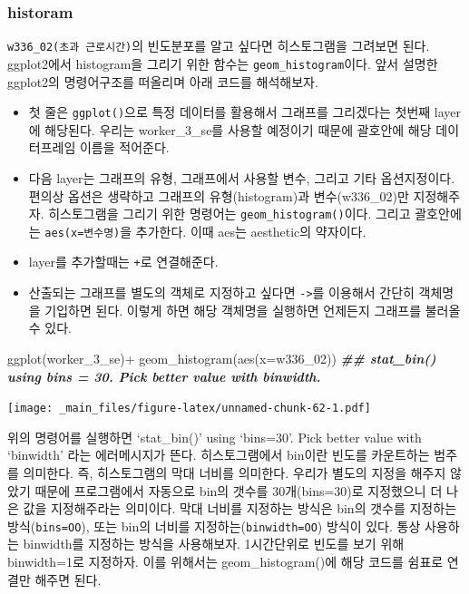 \documentclass[
]{book}
\newenvironment{Shaded}{\begin{snugshade}}{\end{snugshade}}
\newcommand{\AttributeTok}[1]{\textcolor[rgb]{0.77,0.63,0.00}{#1}}
\newcommand{\DocumentationTok}[1]{\textcolor[rgb]{0.56,0.35,0.01}{\textbf{\textit{#1}}}}
\newcommand{\FunctionTok}[1]{\textcolor[rgb]{0.00,0.00,0.00}{#1}}
\newcommand{\NormalTok}[1]{#1}
\newcommand{\SpecialCharTok}[1]{\textcolor[rgb]{0.00,0.00,0.00}{#1}}
\providecommand{\tightlist}{%
  \setlength{\itemsep}{0pt}\setlength{\parskip}{0pt}}
\theoremstyle{definition}
\theoremstyle{definition}
\theoremstyle{definition}
\theoremstyle{definition}
\theoremstyle{remark}
\begin{document}
\hypertarget{historam}{%
\subsubsection{historam}\label{historam}}

\texttt{w336\_02(초과\ 근로시간)}의 빈도분포를 알고 싶다면 히스토그램을 그려보면 된다. ggplot2에서 histogram을 그리기 위한 함수는 \texttt{geom\_histogram}이다. 앞서 설명한 ggplot2의 명령어구조를 떠올리며 아래 코드를 해석해보자.

\begin{itemize}
\tightlist
\item
  첫 줄은 \texttt{ggplot()}으로 특정 데이터를 활용해서 그래프를 그리겠다는 첫번째 layer에 해당된다. 우리는 worker\_3\_se를 사용할 예정이기 때문에 괄호안에 해당 데이터프레임 이름을 적어준다.
\item
  다음 layer는 그래프의 유형, 그래프에서 사용할 변수, 그리고 기타 옵션지정이다. 편의상 옵션은 생략하고 그래프의 유형(histogram)과 변수(w336\_02)만 지정해주자. 히스토그램을 그리기 위한 명령어는 \texttt{geom\_histogram()}이다. 그리고 괄호안에는 \texttt{aes(x=변수명)}을 추가한다. 이때 aes는 aesthetic의 약자이다.
\item
  layer를 추가할때는 \texttt{+}로 연결해준다.
\item
  산출되는 그래프를 별도의 객체로 지정하고 싶다면 \texttt{-\textgreater{}}를 이용해서 간단히 객체명을 기입하면 된다. 이렇게 하면 해당 객체명을 실행하면 언제든지 그래프를 불러올 수 있다.
\end{itemize}

\begin{Shaded}
\begin{Highlighting}[]
\FunctionTok{ggplot}\NormalTok{(worker\_3\_se)}\SpecialCharTok{+}
  \FunctionTok{geom\_histogram}\NormalTok{(}\FunctionTok{aes}\NormalTok{(}\AttributeTok{x=}\NormalTok{w336\_02))}
\DocumentationTok{\#\# \textasciigrave{}stat\_bin()\textasciigrave{} using \textasciigrave{}bins = 30\textasciigrave{}. Pick better value with \textasciigrave{}binwidth\textasciigrave{}.}
\end{Highlighting}
\end{Shaded}

\texttt{[image: \_main\_files/figure-latex/unnamed-chunk-62-1.pdf]}

위의 명령어를 실행하면 `stat\_bin()' using `bins=30'. Pick better value with `binwidth' 라는 에러메시지가 뜬다. 히스토그램에서 bin이란 빈도를 카운트하는 범주를 의미한다. 즉, 히스토그램의 막대 너비를 의미한다. 우리가 별도의 지정을 해주지 않았기 때문에 프로그램에서 자동으로 bin의 갯수를 30개(bins=30)로 지정했으니 더 나은 값을 지정해주라는 의미이다. 막대 너비를 지정하는 방식은 bin의 갯수를 지정하는 방식(\texttt{bins=OO}), 또는 bin의 너비를 지정하는(\texttt{binwidth=OO}) 방식이 있다. 통상 사용하는 binwidth를 지정하는 방식을 사용해보자. 1시간단위로 빈도를 보기 위해 binwidth=1로 지정하자. 이를 위해서는 geom\_histogram()에 해당 코드를 쉼표로 연결만 해주면 된다.
\end{document}

